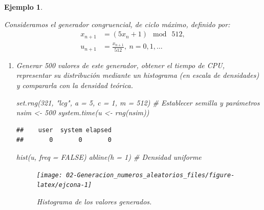 \documentclass[
]{book}
\newenvironment{Shaded}{\begin{snugshade}}{\end{snugshade}}
\newcommand{\AttributeTok}[1]{\textcolor[rgb]{0.77,0.63,0.00}{#1}}
\newcommand{\CommentTok}[1]{\textcolor[rgb]{0.56,0.35,0.01}{\textit{#1}}}
\newcommand{\ConstantTok}[1]{\textcolor[rgb]{0.00,0.00,0.00}{#1}}
\newcommand{\DecValTok}[1]{\textcolor[rgb]{0.00,0.00,0.81}{#1}}
\newcommand{\FunctionTok}[1]{\textcolor[rgb]{0.00,0.00,0.00}{#1}}
\newcommand{\NormalTok}[1]{#1}
\newcommand{\OtherTok}[1]{\textcolor[rgb]{0.56,0.35,0.01}{#1}}
\newcommand{\StringTok}[1]{\textcolor[rgb]{0.31,0.60,0.02}{#1}}
\theoremstyle{break}
\newtheorem{example}{Ejemplo}[chapter]
\theoremstyle{nonumberplain}
\begin{document}
\begin{example}
\protect\hypertarget{exm:congru512}{}\label{exm:congru512}

Consideramos el generador congruencial, de ciclo máximo, definido por:
\[\begin{aligned}
x_{n+1}  & =(5x_{n}+1)\ \bmod\ 512,\nonumber\\
u_{n+1}  & =\frac{x_{n+1}}{512},\ n=0,1,\dots\nonumber
\end{aligned}\]

\begin{enumerate}
\def\labelenumi{\alph{enumi})}
\item
  Generar 500 valores de este generador, obtener el tiempo de CPU,
  representar su distribución mediante un histograma (en escala
  de densidades) y compararla con la densidad teórica.

\begin{Shaded}
\begin{Highlighting}[]
\FunctionTok{set.rng}\NormalTok{(}\DecValTok{321}\NormalTok{, }\StringTok{"lcg"}\NormalTok{, }\AttributeTok{a =} \DecValTok{5}\NormalTok{, }\AttributeTok{c =} \DecValTok{1}\NormalTok{, }\AttributeTok{m =} \DecValTok{512}\NormalTok{)  }\CommentTok{\# Establecer semilla y parámetros}
\NormalTok{nsim }\OtherTok{\textless{}{-}} \DecValTok{500}
\FunctionTok{system.time}\NormalTok{(u }\OtherTok{\textless{}{-}} \FunctionTok{rng}\NormalTok{(nsim)) }
\end{Highlighting}
\end{Shaded}

\begin{verbatim}
##    user  system elapsed 
##       0       0       0
\end{verbatim}

\begin{Shaded}
\begin{Highlighting}[]
\FunctionTok{hist}\NormalTok{(u, }\AttributeTok{freq =} \ConstantTok{FALSE}\NormalTok{)}
\FunctionTok{abline}\NormalTok{(}\AttributeTok{h =} \DecValTok{1}\NormalTok{)                   }\CommentTok{\# Densidad uniforme}
\end{Highlighting}
\end{Shaded}

  \begin{figure}[!htb]

  {\centering \texttt{[image: 02-Generacion\_numeros\_aleatorios\_files/figure-latex/ejcona-1]} 

  }

  \caption{Histograma de los valores generados.}\label{fig:ejcona}
  \end{figure}


\end{enumerate}
\end{example}
\end{document}

